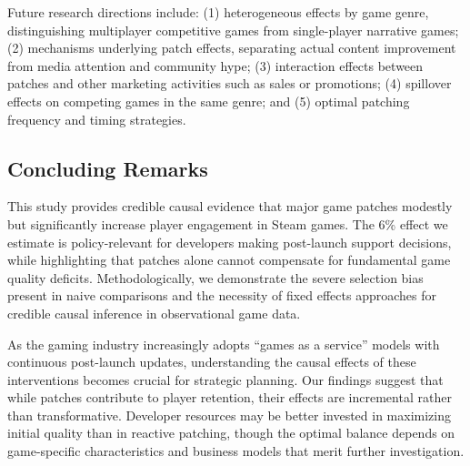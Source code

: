 \documentclass[12pt,a4paper]{article}
\begin{document}
Future research directions include: (1) heterogeneous effects by game genre, distinguishing multiplayer competitive games from single-player narrative games; (2) mechanisms underlying patch effects, separating actual content improvement from media attention and community hype; (3) interaction effects between patches and other marketing activities such as sales or promotions; (4) spillover effects on competing games in the same genre; and (5) optimal patching frequency and timing strategies.

\subsection{Concluding Remarks}

This study provides credible causal evidence that major game patches modestly but significantly increase player engagement in Steam games. The 6\% effect we estimate is policy-relevant for developers making post-launch support decisions, while highlighting that patches alone cannot compensate for fundamental game quality deficits. Methodologically, we demonstrate the severe selection bias present in naive comparisons and the necessity of fixed effects approaches for credible causal inference in observational game data.

As the gaming industry increasingly adopts ``games as a service'' models with continuous post-launch updates, understanding the causal effects of these interventions becomes crucial for strategic planning. Our findings suggest that while patches contribute to player retention, their effects are incremental rather than transformative. Developer resources may be better invested in maximizing initial quality than in reactive patching, though the optimal balance depends on game-specific characteristics and business models that merit further investigation.
\end{document}
